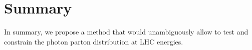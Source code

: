 \section{Summary}

In summary, we propose a method that would unambiguously allow to test and constrain the photon parton distribution at LHC energies.
